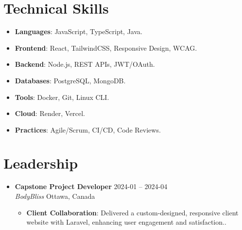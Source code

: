 \documentclass[letterpaper, 10pt]{article}
\newcommand{\resumeItem}[2]{\item\small{\textbf{#1}: #2.}}
\newcommand{\resumeSubheading}[4]{
  \vspace{-1pt}\item \small{
    \textbf{#1} \hfill #2 \\
    \textit{#3} \hfill #4
  }\vspace{-1pt}
}
\newcommand{\resumeSubItem}[2]{\resumeItem{#1}{#2}\vspace{-7pt}}
\newcommand{\resumeSubHeadingListStart}{\begin{itemize}[leftmargin=0.5cm]}
\newcommand{\resumeSubHeadingListEnd}{\end{itemize}}
\newcommand{\resumeItemListStart}{\begin{itemize}}
\newcommand{\resumeItemListEnd}{\end{itemize}\vspace{-5pt}}
\begin{document}
\section{Technical Skills}
\resumeSubHeadingListStart
\resumeSubItem{Languages}
{JavaScript, TypeScript, Java}
\resumeSubItem{Frontend}
{React, TailwindCSS, Responsive Design, WCAG}
\resumeSubItem{Backend}
{Node.js, REST APIs, JWT/OAuth}
\resumeSubItem{Databases}
{PostgreSQL, MongoDB}
\resumeSubItem{Tools}
{Docker, Git, Linux CLI}
\resumeSubItem{Cloud}
{Render, Vercel}
\resumeSubItem{Practices}
{Agile/Scrum, CI/CD, Code Reviews}
\resumeSubHeadingListEnd

\section{Leadership}
\resumeSubHeadingListStart
\resumeSubheading
{Capstone Project Developer}{2024-01 -- 2024-04}
{BodyBliss}{Ottawa, Canada}
\resumeItemListStart
\resumeItem{Client Collaboration}
{Delivered a custom-designed, responsive client website with Laravel, enhancing user engagement and satisfaction.}
\resumeItemListEnd
\resumeSubHeadingListEnd
\end{document}
